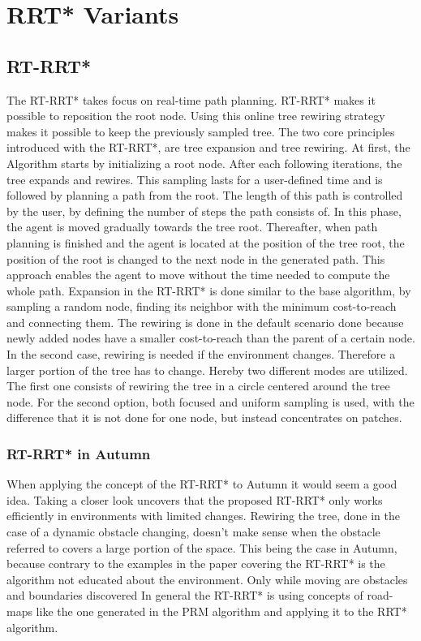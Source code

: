 \section{RRT* Variants}

\subsection{RT-RRT*}

The RT-RRT* takes focus on real-time path planning. RT-RRT* makes it possible to reposition the root node. Using this online tree rewiring strategy makes it possible to keep the previously sampled tree.
The two core principles introduced with the RT-RRT*, are tree expansion and tree rewiring. 
At first, the Algorithm starts by initializing a root node. After each following iterations, the tree expands and rewires. This sampling lasts for a user-defined time and is followed by planning a path from the root. The length of this path is controlled by the user, by defining the number of steps the path consists of. In this phase, the agent is moved gradually towards the tree root. Thereafter, when path planning is finished and the agent is located at the position of the tree root, the position of the root is changed to the next node in the generated path. This approach enables the agent to move without the time needed to compute the whole path.
Expansion in the RT-RRT* is done similar to the base algorithm, by sampling a random node, finding its neighbor with the minimum cost-to-reach and connecting them.
The rewiring is done in the default scenario done because newly added nodes have a smaller cost-to-reach than the parent of a certain node. In the second case, rewiring is needed if the environment changes. Therefore a larger portion of the tree has to change. Hereby two different modes are utilized. The first one consists of rewiring the tree in a circle centered around the tree node. For the second option, both focused and uniform sampling is used, with the difference that it is not done for one node, but instead concentrates on patches.

\subsubsection{RT-RRT* in Autumn}

When applying the concept of the RT-RRT* to Autumn it would seem a good idea. Taking a closer look uncovers that the proposed RT-RRT* only works efficiently in environments with limited changes. Rewiring the tree, done in the case of a dynamic obstacle changing, doesn't make sense when the obstacle referred to covers a large portion of the space. This being the case in Autumn, because contrary to the examples in the paper covering the RT-RRT* is the algorithm not educated about the environment. Only while moving are obstacles and boundaries discovered In general the RT-RRT* is using concepts of road-maps like the one generated in the PRM algorithm and applying it to the RRT* algorithm.  

